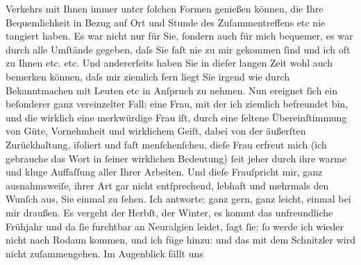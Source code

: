 \begin{ledgroupsized}[t]{13cm}
               Verkehrs mit Ihnen immer unter ſolchen Formen {\pb}genießen können, die Ihre
               Bequemlichkeit in Bezug auf Ort und Stunde des Zuſammentreffens etc nie tangiert
               haben. Es war nicht nur für Sie, ſondern auch für mich bequemer, es war durch alle
               Umſtände gegeben, daſs Sie faſt nie zu mir gekommen ſind und ich oft zu Ihnen etc.
               etc.\pend
           \pstart
           {\pb}Und andererſeits haben Sie in
               dieſer langen Zeit wohl auch bemerken können, daſs mir ziemlich fern liegt Sie irgend
               wie durch Bekanntmachen mit Leuten etc in Anſpruch zu nehmen.\pend
           \pstart
           Nun ereignet ſich ein beſonderer ganz vereinzelter Fall: eine Frau, mit der ich ziemlich befreundet bin,
                  {\pb}und die wirklich eine
               merkwürdige Frau iſt, durch
               eine ſeltene Übereinſtimmung von Güte, Vornehmheit und wirklichem Geiſt, dabei von
               der äußerſten Zurückhaltung, iſoliert und faſt menſchenſcheu, dieſe Frau erfreut mich (ich gebrauche das Wort
               in ſeiner wirklichen Bedeutung) ſeit jeher durch ihre warme {\pb}und kluge Auffaſſung aller Ihrer
               Arbeiten. Und dieſe Frau\strikeout{,}{ }ſpricht mir, ganz ausnahmsweiſe, ihrer Art gar
               nicht entſprechend, lebhaft und mehrmals den Wunſch aus, Sie einmal zu ſehen. Ich
               antworte: ganz gern, ganz leicht, einmal bei mir draußen. Es vergeht der Herbſt, der
               Winter, es {\pb}kommt das
               unfreundliche Frühjahr und da ſie furchtbar an Neuralgien leidet, ſagt ſie: ſo werde
               ich wieder nicht nach Rodaun kommen, und ich füge
               hinzu: und das mit dem Schnitzler wird nicht zuſammengehen. Im Augenblick fällt uns

\end{ledgroupsized}
